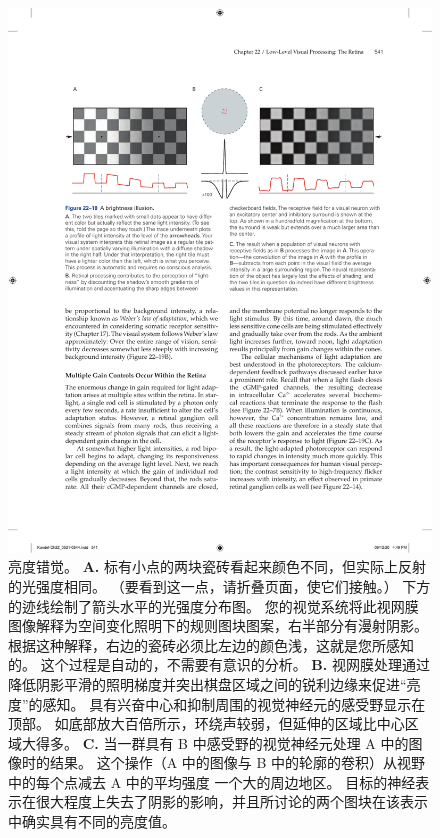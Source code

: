 \begin{figure}[htbp]
	\centering
	\includegraphics[width=1.0\linewidth]{chap22/fig_22_18}
	\caption{亮度错觉。 
		\textbf{A.} 标有小点的两块瓷砖看起来颜色不同，但实际上反射的光强度相同。
		（要看到这一点，请折叠页面，使它们接触。）
		下方的迹线绘制了箭头水平的光强度分布图。 
		您的视觉系统将此视网膜图像解释为空间变化照明下的规则图块图案，右半部分有漫射阴影。 
		根据这种解释，右边的瓷砖必须比左边的颜色浅，这就是您所感知的。
		这个过程是自动的，不需要有意识的分析。 
		\textbf{B.} 视网膜处理通过降低阴影平滑的照明梯度并突出棋盘区域之间的锐利边缘来促进“亮度”的感知。 
		具有兴奋中心和抑制周围的视觉神经元的感受野显示在顶部。 
		如底部放大百倍所示，环绕声较弱，但延伸的区域比中心区域大得多。
		\textbf{C.} 当一群具有 B 中感受野的视觉神经元处理 A 中的图像时的结果。
		这个操作（A 中的图像与 B 中的轮廓的卷积）从视野中的每个点减去 A 中的平均强度 一个大的周边地区。
		目标的神经表示在很大程度上失去了阴影的影响，并且所讨论的两个图块在该表示中确实具有不同的亮度值。}
	\label{fig:22_18}
\end{figure}


